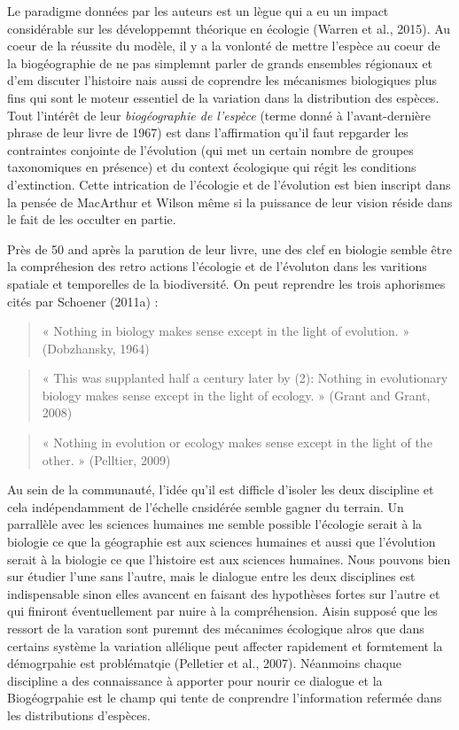 Le paradigme données par les auteurs est un lègue qui a eu un impact
considérable sur les développemnt théorique en écologie (Warren et al.,
2015). Au coeur de la réussite du modèle, il y a la vonlonté de mettre
l'espèce au coeur de la biogéographie de ne pas simplemnt parler de
grands ensembles régionaux et d'em discuter l'histoire nais aussi de
coprendre les mécanismes biologiques plus fins qui sont le moteur
essentiel de la variation dans la distribution des espèces. Tout
l'intérêt de leur \emph{biogéographie de l'espèce} (terme donné à
l'avant-dernière phrase de leur livre de 1967) est dans l'affirmation
qu'il faut repgarder les contraintes conjointe de l'évolution (qui met
un certain nombre de groupes taxonomiques en présence) et du context
écologique qui régit les conditions d'extinction. Cette intrication de
l'écologie et de l'évolution est bien inscript dans la pensée de
MacArthur et Wilson même si la puissance de leur vision réside dans le
fait de les occulter en partie.

Près de 50 and après la parution de leur livre, une des clef en biologie
semble être la compréhesion des retro actions l'écologie et de
l'évoluton dans les varitions spatiale et temporelles de la
biodiversité. On peut reprendre les trois aphorismes cités par Schoener
(2011a) :

\begin{quote}
« Nothing in biology makes sense except in the light of evolution. »
(Dobzhansky, 1964)
\end{quote}

\begin{quote}
« This was supplanted half a century later by (2): Nothing in
evolutionary biology makes sense except in the light of ecology. »
(Grant and Grant, 2008)
\end{quote}

\begin{quote}
« Nothing in evolution or ecology makes sense except in the light of the
other. » (Pelltier, 2009)
\end{quote}

Au sein de la communauté, l'idée qu'il est difficle d'isoler les deux
discipline et cela indépendamment de l'échelle cnsidérée semble gagner
du terrain. Un parrallèle avec les sciences humaines me semble possible
l'écologie serait à la biologie ce que la géographie est aux sciences
humaines et aussi que l'évolution serait à la biologie ce que l'histoire
est aux sciences humaines. Nous pouvons bien sur étudier l'une sans
l'autre, mais le dialogue entre les deux disciplines est indispensable
sinon elles avancent en faisant des hypothèses fortes sur l'autre et qui
finiront éventuellement par nuire à la compréhension. Aisin supposé que
les ressort de la varation sont puremnt des mécanimes écologique alros
que dans certains système la variation allélique peut affecter
rapidement et formtement la démogrpahie est problématqie (Pelletier et
al., 2007). Néanmoins chaque discipline a des connaissance à apporter
pour nourir ce dialogue et la Biogéogrpahie est le champ qui tente de
conprendre l'information refermée dans les distributions d'espèces.

